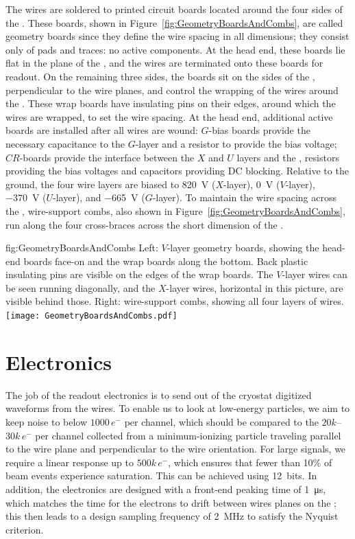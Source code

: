 The wires are soldered to printed circuit boards located around the four sides of the . These boards, shown in Figure~\ref{fig:GeometryBoardsAndCombs}, are called geometry boards since they define the wire spacing in all dimensions; they consist only of pads and traces: no active components. At the head end, these boards lie flat in the plane of the , and the wires are terminated onto these boards for readout. On the remaining three sides, the boards sit on the sides of the , perpendicular to the wire planes, and control the wrapping of the wires around the . These wrap boards have insulating pins on their edges, around which the wires are wrapped, to set the wire spacing. At the head end, additional active boards are installed after all wires are wound: $G$-bias boards provide the necessary capacitance to the $G$-layer and a resistor to provide the bias voltage; $CR$-boards provide the interface between the $X$ and $U$ layers and the , resistors providing the bias voltages and capacitors providing DC blocking. Relative to the ground, the four wire layers are biased to \SI{820}{\volt} ($X$-layer), \SI{0}{\volt} ($V$-layer), \SI{-370}{\volt} ($U$-layer), and \SI{-665}{\volt} ($G$-layer). To maintain the wire spacing across the , wire-support combs, also shown in Figure~\ref{fig:GeometryBoardsAndCombs}, run along the four cross-braces across the short dimension of the .

\begin{dunefigure}{fig:GeometryBoardsAndCombs}
{Left: $V$-layer geometry boards, showing the head-end boards face-on and the wrap boards along the bottom. Back plastic insulating pins are visible on the edges of the wrap boards. The $V$-layer wires can be seen running diagonally, and the $X$-layer wires, horizontal in this picture, are visible behind those.  Right: wire-support combs, showing all four layers of wires.}
\texttt{[image: GeometryBoardsAndCombs.pdf]}
\end{dunefigure}



\section{Electronics}
\label{sec:fdsp-exec-electronics}

The job of the readout electronics is to send out of the cryostat digitized waveforms from the  wires. To enable us to look at low-energy particles, we aim to keep noise to below $1000\,e^{-}$ per channel, which should be compared to the $20k$--$30k\,e^{-}$ per channel collected from a minimum-ionizing particle traveling parallel to the wire plane and perpendicular to the wire orientation. For large signals, we require a linear response up to $500k\,e^{-}$, which ensures that fewer than 10\% of beam events experience saturation. This can be achieved using 12\,  bits. In addition, the electronics are designed with a front-end peaking time of \SI{1}{\micro\second}, which matches the time for the electrons to drift between wires planes on the ; this then leads to a design sampling frequency of \SI{2}{\mega\hertz} to satisfy the Nyquist criterion.

